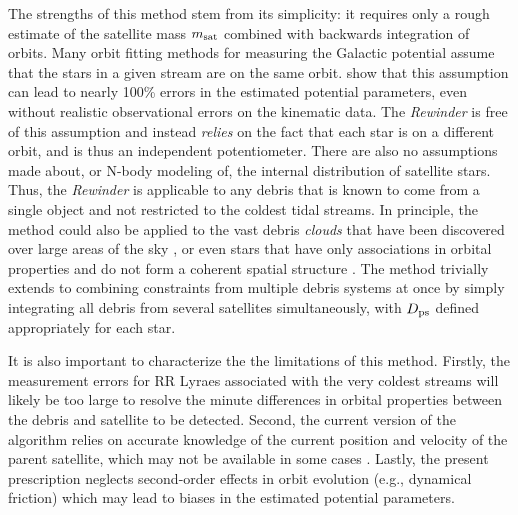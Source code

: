 \documentclass[preprint]{aastex}
\begin{document}
The strengths of this method stem from its simplicity: it requires
only a rough estimate of the satellite mass $m_{\rm sat}$ combined
with backwards integration of orbits. Many orbit fitting methods for measuring the Galactic potential assume
that the stars in a given stream are on the same
orbit. \cite{sanders13a} show that this assumption can lead to nearly
100\% errors in the estimated potential parameters, even without
realistic observational errors on the kinematic data. The
\emph{Rewinder} is free of this assumption and instead \emph{relies}
on the fact that each star is on a different orbit, and is thus an
independent potentiometer. There are also no assumptions made
about, or N-body modeling of, the internal distribution of satellite
stars. Thus, the \emph{Rewinder} is applicable to any debris that is
known to come from a single object and not restricted to the coldest
tidal streams. In principle, the method could also be applied to the
vast debris {\it clouds} that have been discovered over large areas of
the sky \citep[e.g. the Triangulum Andromeda and Hercules-Aquila
  clouds]{rochapinto04,belokurov06}, or even stars that have only
associations in orbital properties and do not form a coherent spatial
structure \citep[such as the angular momentum groupings in local
  giants found by][]{helmi99}. The method trivially extends to
combining constraints from multiple debris systems at once by simply
integrating all debris from several satellites simultaneously, with
$D_{\rm ps}$ defined appropriately for each star.

It is also important to characterize the the limitations of this
method. Firstly, the measurement errors for RR Lyraes associated with
the very coldest streams \citep[e.g., the globular clusters Pal5 and
  GD1;][]{odenkirchen02,koposov10} will likely be too large to resolve
the minute differences in orbital properties between the debris and
satellite to be detected. Second, the current version of the algorithm
relies on accurate knowledge of the current position and velocity of
the parent satellite, which may not be available in some cases
\citep[for example, the Orphan Stream;][]{belokurov07}. Lastly, the
present prescription neglects second-order effects in orbit evolution (e.g.,
dynamical friction) which may lead to biases in
the estimated potential parameters.

\end{document}
